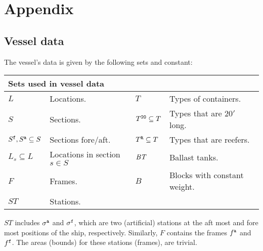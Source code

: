 

\section*{Appendix}
\subsection*{Vessel data}
The vessel's data is given by the following sets and constant:

\vspace{1mm}
\noindent
\begin{tabular}{p{1.8cm}p{4cm}|p{1.3cm}p{4.5cm}}
\multicolumn{2}{l}{\textbf{Sets used in vessel data}}\\
\hline\noalign{\smallskip}
$L$  & Locations. &
$T$	 & Types of containers.\\ 
$S$	 & Sections. &
$T^{\texttt{20}}\subseteq T$ & Types that are $20'$ long. \\
$S^{\texttt{f}}, S^{\texttt{a}}\subseteq S$ & Sections fore/aft. &
$T^{\texttt{R}}\subseteq T$ & Types that are reefers.\\
$L_s\subseteq L$ & Locations in section $s\in S$ &
$\mathit{BT}$ & Ballast tanks. \\
$F$	 & Frames. &
$B$ & Blocks with constant weight.\\
$ST$ & Stations. 
\end{tabular}

\vspace{1mm}
\noindent
$ST$ includes $\sigma^{\texttt{a}}$ and $\sigma^{\texttt{f}}$, which are two (artificial) stations at the aft most and fore most positions of the ship, respectively. Similarly, $F$ contains the frames $f^{\texttt{a}}$ and $f^{\texttt{f}}$. The areas (bounds) for these stations (frames), are trivial.

